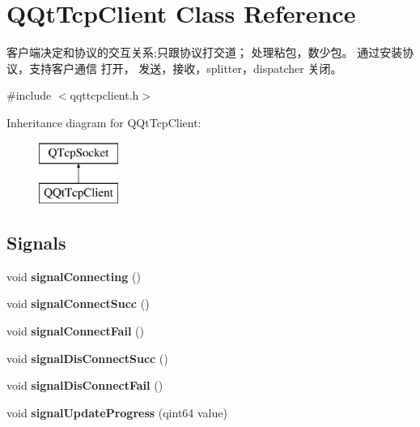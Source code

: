 \hypertarget{class_q_qt_tcp_client}{}\section{Q\+Qt\+Tcp\+Client Class Reference}
\label{class_q_qt_tcp_client}


客户端决定和协议的交互关系;只跟协议打交道； 处理粘包，数少包。 通过安装协议，支持客户通信 打开， 发送，接收，splitter，dispatcher 关闭。  




{\ttfamily \#include $<$qqttcpclient.\+h$>$}

Inheritance diagram for Q\+Qt\+Tcp\+Client\+:\begin{figure}[H]
\begin{center}
\leavevmode
\includegraphics[height=2.000000cm]{class_q_qt_tcp_client}
\end{center}
\end{figure}
\subsection*{Signals}
\begin{DoxyCompactItemize}
\item 
\mbox{\label{class_q_qt_tcp_client_a51b638a84dff755f0f509c27823dc122}} 
void {\bfseries signal\+Connecting} ()
\item 
\mbox{\label{class_q_qt_tcp_client_a90fcc358ea5764614328aa676fa06bc4}} 
void {\bfseries signal\+Connect\+Succ} ()
\item 
\mbox{\label{class_q_qt_tcp_client_af82c9e13bed2cb768e09ee81f0df8c91}} 
void {\bfseries signal\+Connect\+Fail} ()
\item 
\mbox{\label{class_q_qt_tcp_client_a562535e3315d2be93741d4bb0d369656}} 
void {\bfseries signal\+Dis\+Connect\+Succ} ()
\item 
\mbox{\label{class_q_qt_tcp_client_a1dc56db0582fd94f9a1f799b8f13b6ef}} 
void {\bfseries signal\+Dis\+Connect\+Fail} ()
\item 
\mbox{\label{class_q_qt_tcp_client_ae65d75e00ae9ba29a392c155a451245e}} 
void {\bfseries signal\+Update\+Progress} (qint64 value)
\end{DoxyCompactItemize}
